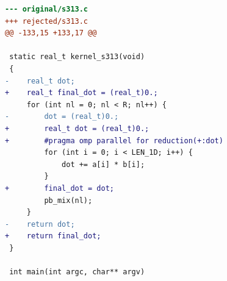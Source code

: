 \begin{lstlisting}[language=diff,basicstyle=\ttfamily\scriptsize,breaklines=true,caption={tsvc/s313 — attempt 2 of 3, rejected by the gate at 'tsan': Race detected: / WARNING: ThreadSanitizer: data race (pid=3816835)}]
--- original/s313.c
+++ rejected/s313.c
@@ -133,15 +133,17 @@
 
 static real_t kernel_s313(void)
 {
-    real_t dot;
+    real_t final_dot = (real_t)0.;
     for (int nl = 0; nl < R; nl++) {
-        dot = (real_t)0.;
+        real_t dot = (real_t)0.;
+        #pragma omp parallel for reduction(+:dot) 
         for (int i = 0; i < LEN_1D; i++) {
             dot += a[i] * b[i];
         }
+        final_dot = dot;
         pb_mix(nl);
     }
-    return dot;
+    return final_dot;
 }
 
 int main(int argc, char** argv)
\end{lstlisting}
